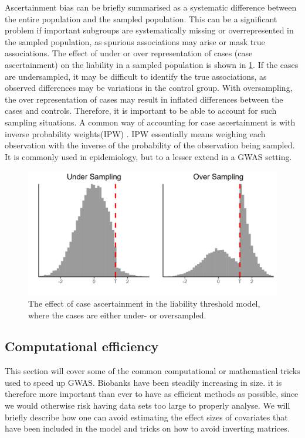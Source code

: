 Ascertainment bias can be briefly summarised as a systematic difference between the entire population and the sampled population. This can be a significant problem if important subgroups are systematically missing or overrepresented in the sampled population, as spurious associations may arise or mask true associations. The effect of under or over representation of cases (case ascertainment) on the liability in a sampled population is shown in \cref{fig:bias:ascertainment}. If the cases are undersampled, it may be difficult to identify the true associations, as observed differences may be variations in the control group. With oversampling, the over representation of cases may result in inflated differences between the cases and controls. Therefore, it is important to be able to account for such sampling situations. A common way of accounting for case ascertainment is with inverse probability weights(IPW) \cite{koul1981regression}. IPW essentially means weighing each observation with the inverse of the probability of the observation being sampled. It is commonly used in epidemiology, but to a lesser extend in a GWAS setting\cite{seaman2013review}. 

\begin{figure}[!h]
	\centering
	\includegraphics[width=\textwidth]{methods/liablity_sampling_plot.png}
	\caption{The effect of case ascertainment in the liability threshold model, where the cases are either under- or oversampled.}
	\label{fig:bias:ascertainment}
\end{figure}


\subsection{Computational efficiency} \label{sec:computationalEfficiency}
This section will cover some of the common computational or mathematical tricks used to speed up GWAS. Biobanks have been steadily increasing in size. it is therefore more important than ever to have as efficient methods as possible, since we would otherwise risk having data sets too large to properly analyse. We will briefly describe how one can avoid estimating the effect sizes of covariates that have been included in the model and tricks on how to avoid inverting matrices. 

